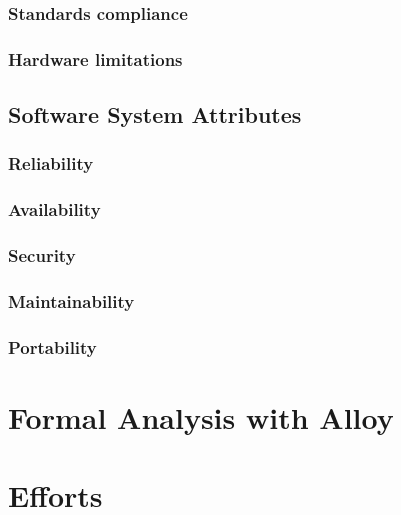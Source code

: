 \documentclass{article}
\begin{document}
\subsubsection{Standards compliance}
\subsubsection{Hardware limitations}

\subsection{Software System Attributes}
\subsubsection{Reliability}
\subsubsection{Availability}
\subsubsection{Security}
\subsubsection{Maintainability}
\subsubsection{Portability}

\section{Formal Analysis with Alloy}

\section{Efforts}




    
\end{document}
